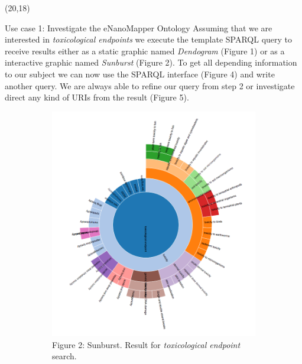 \documentclass[final]{beamer}
\begin{document}
\begin{frame}{}
    \begin{textblock}{62}(20,18)
      \justifying
      \begin{block}{Use case 1: Investigate the eNanoMapper Ontology}
        Assuming that we are interested in \emph{toxicological endpoints} we execute the template SPARQL query to receive results either as a static graphic named \emph{Dendogram} (Figure 1) or as a interactive graphic named \emph{Sunburst} (Figure 2). To get all depending information to our subject we can now use the SPARQL interface (Figure 4) and write another query. We are always able to refine our query from step 2 or investigate direct any kind of URIs from the result (Figure 5).
        \begin{figure}
          \hspace{-0.15\textwidth}
          \begin{subfigure}[c]{0.3\textwidth}
            \includegraphics[width=\textwidth,keepaspectratio]{onto-use-case-1a.png}
            \caption{Figure 2: Sunburst. Result for \emph{toxicological endpoint} search.}
          \end{subfigure}
          \hspace{0.25\textwidth}
          \begin{subfigure}[c]{0.2\textwidth}

\end{subfigure}
\end{figure}
\end{block}
\end{textblock}
\end{frame}
\end{document}
